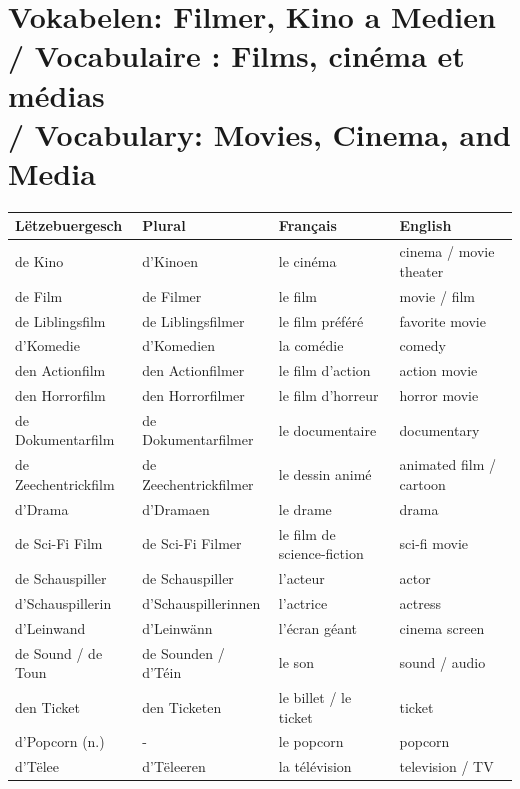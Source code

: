 \vspace{1.5em}

\section[Vokabelen: Filmer, Kino a Medien / Vocabulary Table]{Vokabelen: Filmer, Kino a Medien \\/ Vocabulaire : Films, cinéma et médias \\/ Vocabulary: Movies, Cinema, and Media}

\begin{table}[h!]
\centering
\small
\begin{tabular}{p{3.5cm}p{3.2cm}p{4.0cm}p{4.0cm}}
\toprule
\textbf{Lëtzebuergesch} & \textbf{Plural} & \textbf{Français} & \textbf{English} \\
\midrule
de Kino & d'Kinoen & le cinéma & cinema / movie theater \\
de Film & de Filmer & le film & movie / film \\
de Liblingsfilm & de Liblingsfilmer & le film préféré & favorite movie \\
d'Komedie & d'Komedien & la comédie & comedy \\
den Actionfilm & den Actionfilmer & le film d'action & action movie \\
den Horrorfilm & den Horrorfilmer & le film d'horreur & horror movie \\
de Dokumentarfilm & de Dokumentarfilmer & le documentaire & documentary \\
de Zeechentrickfilm & de Zeechentrickfilmer & le dessin animé & animated film / cartoon \\
d'Drama & d'Dramaen & le drame & drama \\
de Sci-Fi Film & de Sci-Fi Filmer & le film de science-fiction & sci-fi movie \\
de Schauspiller & de Schauspiller & l'acteur & actor \\
d'Schauspillerin & d'Schauspillerinnen & l'actrice & actress \\
d'Leinwand & d'Leinwänn & l'écran géant & cinema screen \\
de Sound / de Toun & de Sounden / d'Téin & le son & sound / audio \\
den Ticket & den Ticketen & le billet / le ticket & ticket \\
d'Popcorn (n.) & - & le popcorn & popcorn \\
d'Tëlee & d'Tëleeren & la télévision & television / TV \\

\end{tabular}
\end{table}
